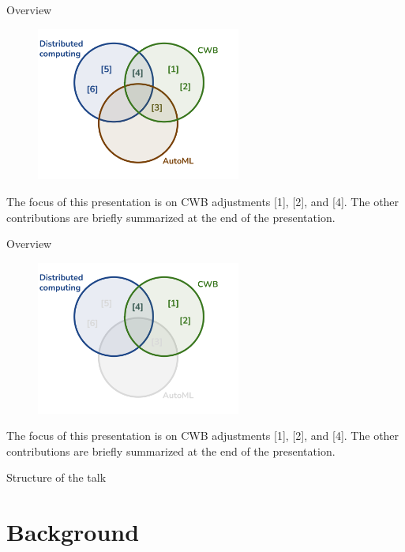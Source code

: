 \documentclass[t,10pt]{beamer}
\begin{document}
\begin{frame}{Overview}
  \begin{figure}
    \centering
    \includegraphics[width=0.6\textwidth]{figures/topics.png}
  \end{figure}\vspace{-0.2cm}
  The focus of this presentation is on CWB adjustments {[}1{]}, {[}2{]}, and {[}4{]}. The other contributions are briefly summarized at the end of the presentation.
\end{frame}

\begin{frame}{Overview}
  \begin{figure}
    \centering
    \includegraphics[width=0.6\textwidth]{figures/topics-relevant.png}
  \end{figure}\vspace{-0.2cm}
  The focus of this presentation is on CWB adjustments {[}1{]}, {[}2{]}, and {[}4{]}. The other contributions are briefly summarized at the end of the presentation.
    \addtocounter{framenumber}{-1}
\end{frame}


\begin{frame}[plain]{Structure of the talk}
    \tableofcontents
    \addtocounter{framenumber}{-1}
\end{frame}

\section{Background}
\end{document}
